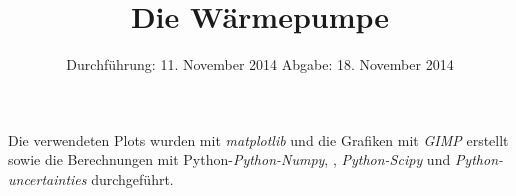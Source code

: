 
\subject{Anfängerpraktikum V206}
\title{Die Wärmepumpe}
\date{
  Durchführung: 11. November 2014
  \hspace{1em}
  Abgabe: 18. November 2014
}


\maketitle
\thispagestyle{empty}
\newpage





\newpage
\printbibliography
Die verwendeten Plots wurden mit \textit{matplotlib}\cite{matplotlib} und die Grafiken mit \textit{GIMP}\cite{gimp} erstellt sowie die Berechnungen mit Python-\textit{Python-Numpy}, \cite{numpy}, \textit{Python-Scipy}\cite{scipy} und \textit{Python-uncertainties}\cite{uncertainties} durchgeführt.

